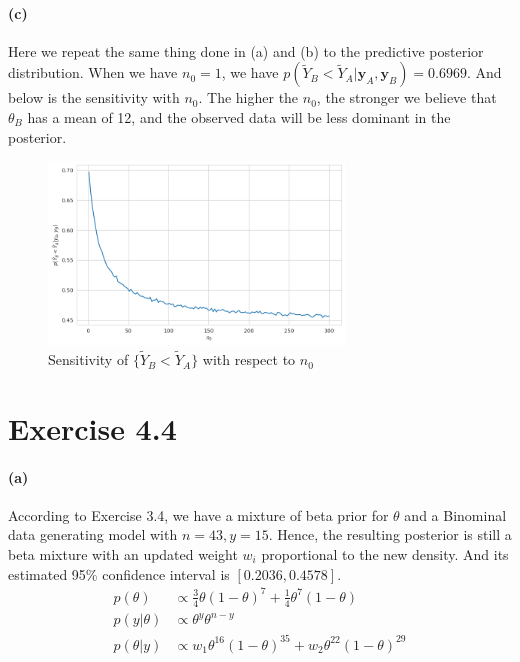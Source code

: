 \documentclass[11pt, letterpaper]{article}
\begin{document}
\paragraph{(c)}
Here we repeat the same thing done in (a) and (b) to the predictive posterior distribution. When we have $n_0=1$, we have $p(\tilde{Y}_B < \tilde{Y}_A|\mathbf{y}_A, \mathbf{y}_B) = 0.6969$. And below is the sensitivity with $n_0$. The higher the $n_0$, the stronger we believe that $\theta_B$ has a mean of 12, and the observed data will be less dominant in the posterior.

\begin{figure}[!h]
  \centering
  \includegraphics[width=0.7\textwidth]{4.2.c.png}
  \captionsetup{justification=centering}
  \caption{Sensitivity of $\{\tilde{Y}_B < \tilde{Y}_A\}$ with respect to $n_0$}
\end{figure}
\newpage

\section{Exercise 4.4}
\paragraph{(a)}
According to Exercise 3.4, we have a mixture of beta prior for $\theta$ and a Binominal data generating model with $n=43, y=15$. Hence, the resulting posterior is still a beta mixture with an updated weight $w_i$ proportional to the new density. And its estimated 95\% confidence interval is $[0.2036, 0.4578]$.
\begin{align*}
    p(\theta) &\propto \frac{3}{4} \theta (1-\theta)^7 + \frac{1}{4} \theta^7(1-\theta) \\
    p(y|\theta) &\propto \theta^y \theta^{n-y} \\
    p(\theta|y) &\propto w_1 \theta^{16} (1-\theta)^{35} + w_2 \theta^{22}(1-\theta)^{29}
\end{align*}
\end{document}
